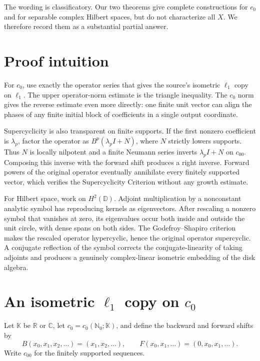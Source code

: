 \documentclass[11pt]{article}
\newcommand{\D}{\mathbb D}
\newcommand{\K}{\mathbb K}
\begin{document}
The wording is classificatory. Our two theorems give complete constructions
for $c_0$ and for separable complex Hilbert spaces, but do not characterize
all $X$. We therefore record them as a substantial partial answer.

\section{Proof intuition}

For $c_0$, use exactly the operator series that gives the source's isometric
$\ell_1$ copy on $\ell_1$. The upper operator-norm estimate is the triangle
inequality. The $c_0$ norm gives the reverse estimate even more directly:
one finite unit vector can align the phases of any finite initial block of
coefficients in a single output coordinate.

Supercyclicity is also transparent on finite supports. If the first nonzero
coefficient is $\lambda_p$, factor the operator as $B^p(\lambda_pI+N)$,
where $N$ strictly lowers supports. Thus $N$ is locally nilpotent and a
finite Neumann series inverts $\lambda_pI+N$ on $c_{00}$. Composing this
inverse with the forward shift produces a right inverse. Forward powers of
the original operator eventually annihilate every finitely supported vector,
which verifies the Supercyclicity Criterion without any growth estimate.

For Hilbert space, work on $H^2(\D)$. Adjoint multiplication by a nonconstant
analytic symbol has reproducing kernels as eigenvectors. After rescaling a
nonzero symbol that vanishes at zero, its eigenvalues occur both inside and
outside the unit circle, with dense spans on both sides. The
Godefroy--Shapiro criterion makes the rescaled operator hypercyclic, hence
the original operator supercyclic. A conjugate reflection of the symbol
corrects the conjugate-linearity of taking adjoints and produces a genuinely
complex-linear isometric embedding of the disk algebra.

\section{An isometric \texorpdfstring{$\ell_1$}{ell-1} copy on
\texorpdfstring{$c_0$}{c-0}}

Let $\K$ be $\mathbb R$ or $\mathbb C$, let
\(c_0=c_0(\mathbb N_0;\K)\), and define the backward and forward shifts by
\[
 B(x_0,x_1,x_2,\ldots)=(x_1,x_2,\ldots),
 \qquad
 F(x_0,x_1,\ldots)=(0,x_0,x_1,\ldots).
\]
Write $c_{00}$ for the finitely supported sequences.
\end{document}
